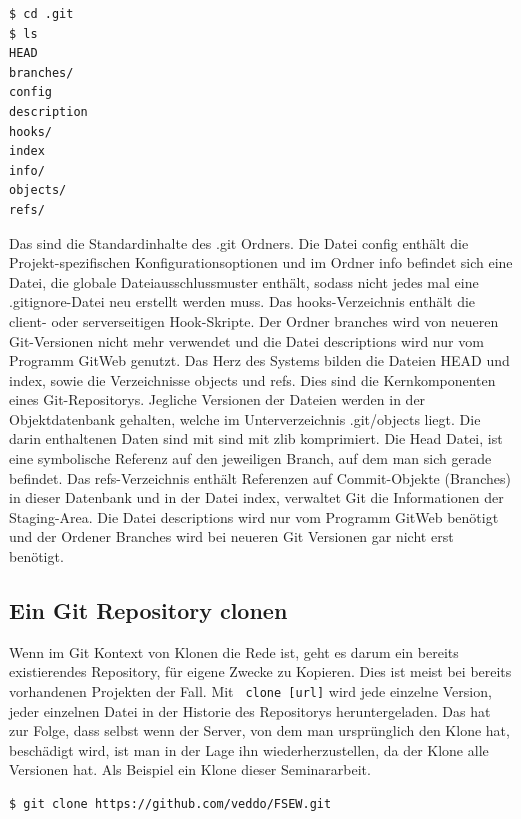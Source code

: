 \documentclass[12pt,a4paper,bibliography=totocnumbered,listof=totocnumbered]{scrartcl}
\begin{document}
\begin{lstlisting}
$ cd .git
$ ls
HEAD
branches/
config
description
hooks/
index
info/
objects/
refs/
\end{lstlisting}

Das sind die Standardinhalte des .git Ordners. Die Datei config enthält die Projekt-spezifischen Konfigurationsoptionen und im Ordner info befindet sich eine Datei, die globale Dateiausschlussmuster enthält, sodass nicht jedes mal eine  .gitignore-Datei neu erstellt werden muss. Das hooks-Verzeichnis enthält die client- oder serverseitigen Hook-Skripte.
Der Ordner branches wird von neueren Git-Versionen nicht mehr verwendet und die Datei descriptions wird nur vom Programm GitWeb genutzt. Das Herz des Systems  bilden die Dateien HEAD und index, sowie die Verzeichnisse objects und refs. Dies sind die Kernkomponenten eines Git-Repositorys. Jegliche Versionen der Dateien werden in der Objektdatenbank gehalten, welche im Unterverzeichnis .git/objects liegt. Die darin enthaltenen Daten sind mit sind mit zlib komprimiert. Die Head Datei,  ist eine symbolische Referenz auf den jeweiligen Branch, auf dem man sich gerade befindet.	Das refs-Verzeichnis enthält Referenzen auf Commit-Objekte (Branches) in dieser Datenbank und in der Datei index, verwaltet Git die Informationen der Staging-Area. Die Datei descriptions wird nur vom Programm GitWeb benötigt und der Ordener Branches wird bei neueren Git Versionen gar nicht erst benötigt.

\subsection{Ein Git Repository clonen}
Wenn im Git Kontext von Klonen die Rede ist, geht es darum ein bereits existierendes Repository, für eigene Zwecke zu Kopieren. Dies ist meist bei bereits vorhandenen Projekten der Fall. Mit \lstinline| clone [url]| wird jede einzelne Version, jeder einzelnen Datei in der Historie des Repositorys heruntergeladen. Das hat zur Folge, dass selbst wenn der Server, von dem man ursprünglich den Klone hat, beschädigt wird, ist man in der Lage ihn wiederherzustellen, da der Klone alle Versionen hat. Als Beispiel ein Klone dieser Seminararbeit.

\vspace{1em}
\begin{lstlisting}[caption=Git Repository Klonen, label=lst:arduino]
$ git clone https://github.com/veddo/FSEW.git
\end{lstlisting}
\end{document}
